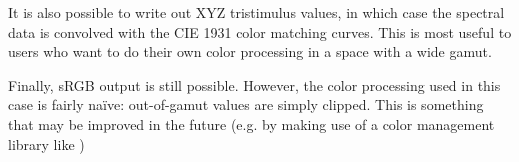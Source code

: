 It is also possible to write out XYZ tristimulus values, in which case the spectral
data is convolved with the CIE 1931 color matching curves. This is most useful to users
who want to do their own color processing in a space with a wide gamut.

Finally, sRGB output is still possible. However, the color processing used in this case
is fairly na\"ive: out-of-gamut values are simply clipped. This is something that may
be improved in the future (e.g. by making use of a color management library like )
